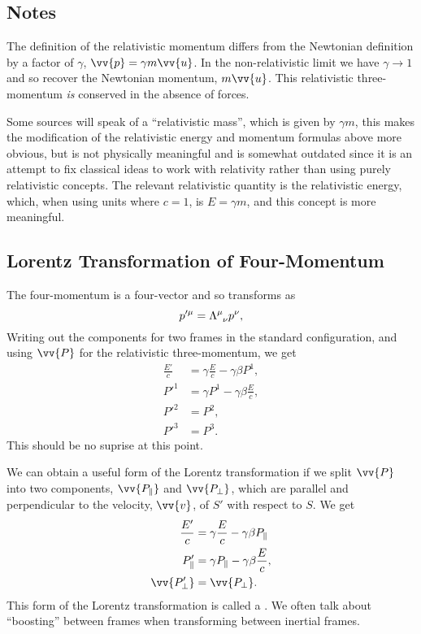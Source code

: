 \documentclass[fleqn]{NotesClass}
\begin{document}
    \subsection{Notes}
    The definition of the relativistic momentum differs from the Newtonian definition by a factor of \(\gamma\), \(\vv{p} = \gamma m\vv{u}\).
    In the non-relativistic limit we have \(\gamma \to 1\) and so recover the Newtonian momentum, \(m\vv{u}\).
    This relativistic three-momentum \emph{is} conserved in the absence of forces.
    
    Some sources will speak of a \enquote{relativistic mass}, which is given by \(\gamma m\), this makes the modification of the relativistic energy and momentum formulas above more obvious, but is not physically meaningful and is somewhat outdated since it is an attempt to fix classical ideas to work with relativity rather than using purely relativistic concepts.
    The relevant relativistic quantity is the relativistic energy, which, when using units where \(c = 1\), is \(E = \gamma m\), and this concept is more meaningful.
    
    \subsection{Lorentz Transformation of Four-Momentum}
    The four-momentum is a four-vector and so transforms as
    \begin{equation}
        p'^\mu = \tensor{\Lambda}{^\mu_\nu}p^\nu,
    \end{equation}
    Writing out the components for two frames in the standard configuration, and using \(\vv{P}\) for the relativistic three-momentum, we get
    \begin{align}
        \frac{E'}{c} &= \gamma\frac{E}{c} - \gamma \beta P^1,\\
        P'^1 &= \gamma P^1 - \gamma\beta \frac{E}{c},\\
        P'^2 &= P^2,\\
        P'^3 &= P^3.
    \end{align}
    This should be no suprise at this point.
    
    We can obtain a useful form of the Lorentz transformation if we split \(\vv{P}\) into two components, \(\vv{P_{\parallel}}\) and \(\vv{P_{\perp}}\), which are parallel and perpendicular to the velocity, \(\vv{v}\), of \(S'\) with respect to \(S\).
    We get
    \begin{align}
        \frac{E'}{c} &= \gamma\frac{E}{c} - \gamma\beta P_{\parallel}\\
        P'_{\parallel} &= \gamma P_{\parallel} - \gamma\beta\frac{E}{c},\\
        \vv{P_{\perp}'} &= \vv{P_{\perp}}.
    \end{align}
    This form of the Lorentz transformation is called a .
    We often talk about \enquote{boosting} between frames when transforming between inertial frames.
    
    
    \backmatter
    \renewcommand{\glossaryname}{Acronyms}
    \printglossary[acronym]
    \printindex
\end{document}
